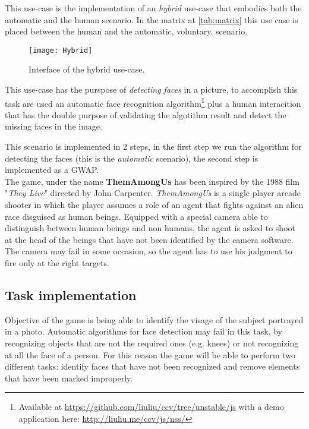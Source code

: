 This use-case is the implementation of an \emph{hybrid} use-case that embodies
both the automatic and the human scenario. In the matrix at \autoref{tab:matrix}
this use case is placed between the human and the automatic, voluntary, scenario.

\begin{figure}[htb]
    \centering
    \texttt{[image: Hybrid]}
    \caption{Interface of the hybrid use-case.}
    \label{fig:Hybrid1}
\end{figure}

This use-case has the purspose of \emph{detecting faces} in a picture, to
accomplish this task are used an automatic face recognition algorithm\footnote{
Available at \url{https://github.com/liuliu/ccv/tree/unstable/js} with a demo
application here: \url{http://liuliu.me/ccv/js/nss/}} plus a human interacition
that has the double purpose of validating the algotithm result and detect the
missing faces in the image.

This scenario is implemented in 2 steps, in the first step we run the algorithm
for detecting the faces (this is the \emph{automatic} scenario), the second step
is implemented as a \ac{GWAP}.\\

The game, under the name \textbf{ThemAmongUs} has been inspired by the 1988
film "\emph{They Live}" directed by John Carpenter. \emph{ThemAmongUs} is a
single player arcade shooter in which the player assumes a role of an agent that
fights against an alien race disguised as human beings. Equipped with a special
camera able to distinguish between human beings and non humans, the agent is
asked to shoot at the head of the beings that have not been identified by the
camera software. The camera may fail in some occasion, so the agent has to use
his judgment to fire only at the right targets.

\subsection{Task implementation}
Objective of the game is being able to identify the visage of the subject
portrayed in a photo. Automatic algorithms for face detection may fail in this
task, by recognizing objects that are not the required ones (e.g. knees) or not
recognizing at all the face of a person. For this reason the game will be able
to perform two different tasks: identify faces that have not been recognized and
remove elements that have been marked improperly.

